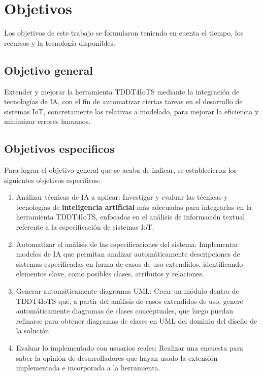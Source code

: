 \section{Objetivos}\label{section:objetivos}

Los objetivos de este trabajo se formularon teniendo en cuenta el tiempo, los recursos y la tecnología disponibles.

\subsection{Objetivo general}

Extender y mejorar la herramienta TDDT4IoTS mediante la integración de tecnologías de IA, con el fin de automatizar ciertas tareas en el desarrollo de sistemas IoT, concretamente las relativas a modelado, para mejorar la eficiencia y minimizar errores humanos.

\subsection{Objetivos especificos}

Para lograr el objetivo general que se acaba de indicar, se establecieron los siguientes objetivos específicos:

\begin{enumerate}
	\item Análizar técnicas de IA a aplicar: Investigar y evaluar las técnicas y tecnologías de \textbf{inteligencia artificial} más adecuadas para integrarlas en la herramienta TDDT4IoTS, enfocadas en el análisis de información textual referente a la especificación de sistemas IoT.
	
	\item Automatizar el análisis de las especificaciones del sistema: Implementar modelos de IA que permitan analizar automáticamente descripciones de sistemas especificadas en forma de casos de uso extendidos, identificando elementos clave, como posibles clases, atributos y relaciones.
	
	\item Generar automáticamente diagramas UML: Crear un módulo dentro de TDDT4IoTS que, a partir del análisis de casos extendidos de uso, genere automáticamente diagramas de clases conceptuales, que luego puedan refinarse para obtener diagramas de clases en UML del dominio del diseño de la solución.
	
	\item Evaluar lo implementado con usuarios reales: Realizar una encuesta para saber la opinión de desarrolladores que hayan usado la extensión implementada e incorporada a la herramienta.

\end{enumerate}